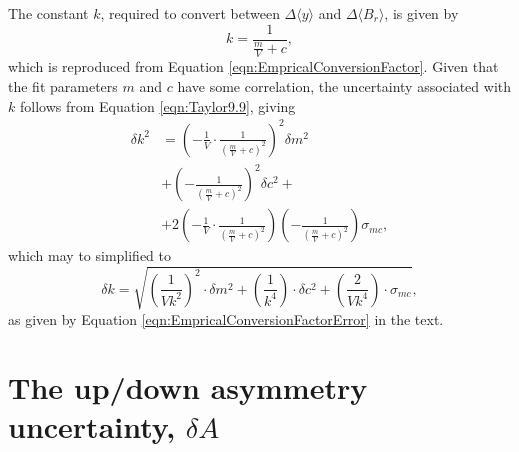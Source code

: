 \begin{appendices}
The constant $k$, required to convert between $\Delta \langle y \rangle$ and $\Delta \langle B_{r} \rangle$, is given by 
%
\begin{equation}
  k = \frac{1}{\frac{m}{V} + c},
  \label{eqn:EmpricalConversionFactor2}
\end{equation}
%
which is reproduced from Equation \ref{eqn:EmpricalConversionFactor}. Given that the fit parameters $m$ and $c$ have some correlation, the uncertainty associated with $k$ follows from Equation \ref{eqn:Taylor9.9}, giving 
%
\begin{equation}
\begin{aligned}
  \delta k^{2} &= \left(-\frac{1}{V}\cdot\frac{1}{(\frac{m}{V}+c)^{2}}\right)^{2}\delta m^{2} \\
  & + \left(-\frac{1}{(\frac{m}{V}+c)^{2}}\right)^{2}\delta c^{2} + \\ 
  & + 2\left(-\frac{1}{V}\cdot\frac{1}{(\frac{m}{V}+c)^{2}}\right)\left(-\frac{1}{(\frac{m}{V}+c)^{2}}\right)\sigma_{mc},
  \label{eqn:DeltaK1}
\end{aligned}
\end{equation}
%
which may to simplified to 
%
\begin{equation}
  \delta k = \sqrt{ \left(\frac{1}{Vk^{2}}\right)^{2}\cdot \delta m^{2} 
  + \left(\frac{1}{k^{4}}\right)\cdot\delta c^{2}
  + \left(\frac{2}{Vk^{4}}\right)\cdot \sigma_{mc} }, 
\end{equation}
%
as given by Equation \ref{eqn:EmpricalConversionFactorError} in the text.

\section{The up/down asymmetry uncertainty, $\delta A$}\label{app:A}


\end{appendices}
